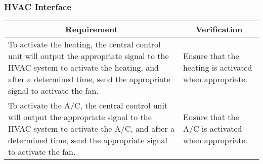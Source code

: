 \subsubsection{HVAC Interface}
\begin{tabular}{|p{\mytabwidth}|p{\mytabwidth}|}
\hline
\multicolumn{1}{|c|}{Requirement} & \multicolumn{1}{|c|}{Verification} \\
\hline\hline
To activate the heating, the central control unit will output the appropriate signal to the HVAC system to activate the heating, and after a determined time, send the appropriate signal to activate the fan. &
Ensure that the heating is activated when appropriate. \\
\hline
To activate the A/C, the central control unit will output the appropriate signal to the HVAC system to activate the A/C, and after a determined time, send the appropriate signal to activate the fan. &
Ensure that the A/C is activated when appropriate. \\
\hline
\end{tabular}
